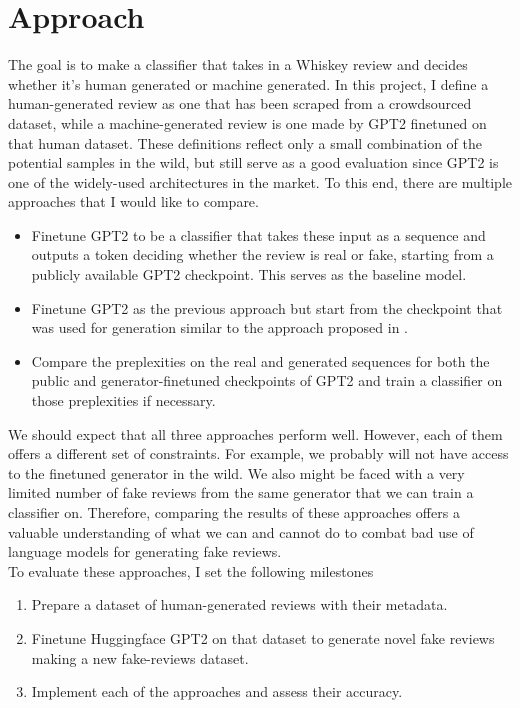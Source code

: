 \documentclass{article}
\begin{document}
\section{Approach}
The goal is to make a classifier that takes in a Whiskey review and decides whether it's human generated or machine generated.  In this project, I define a human-generated review as one that has been scraped from a crowdsourced dataset, while a machine-generated review is one made by GPT2 finetuned on that human dataset. These definitions reflect only a small combination of the potential samples in the wild, but still serve as a good evaluation since GPT2 is one of the widely-used architectures in the market. To this end, there are multiple approaches that I would like to compare. 
\begin{itemize}
\item Finetune GPT2 to be a classifier that takes these input as a sequence and outputs a token deciding whether the review is real or fake, starting from a publicly available GPT2 checkpoint. This serves as the baseline model.
\item Finetune GPT2 as the previous approach but start from the checkpoint that was used for generation similar to the approach proposed in \cite{zellers2020defending}.
\item Compare the preplexities on the real and generated sequences for both the public and generator-finetuned checkpoints of GPT2 and train a classifier on those preplexities if necessary. 
\end{itemize}
We should expect that all three approaches perform well. However, each of them offers a different set of constraints. For example, we probably will not have access to the finetuned generator in the wild. We also might be faced with a very limited number of fake reviews from the same generator that we can train a classifier on. Therefore, comparing the results of these approaches offers a valuable understanding of what we can and cannot do to combat bad use of language models for generating fake reviews.
\\ To evaluate these approaches, I set the following milestones
\begin{enumerate}
\item Prepare a dataset of human-generated reviews with their metadata.
\item Finetune Huggingface GPT2 on that dataset to generate novel fake reviews making a new fake-reviews dataset.
\item Implement each of the approaches and assess their accuracy.
\end{enumerate}
\end{document}
